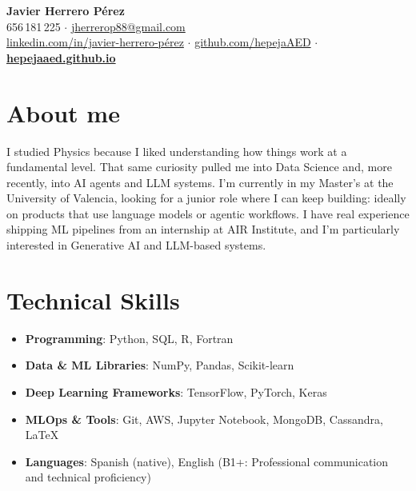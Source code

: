\documentclass[letterpaper,10pt]{article}
\newcommand{\resumeItem}[1]{\item\small{#1}}
\newcommand{\resumeSubHeadingList}{\begin{itemize}[leftmargin=0.1in, label={}, topsep=4pt, itemsep=6pt, parsep=0pt]}
\newcommand{\resumeSubHeadingListEnd}{\end{itemize}}
\begin{document}
\begin{center}
  {\color{accent}\textbf{\Huge Javier Herrero Pérez}} \\[5pt]
  \small
  656\,181\,225 \textcolor{accent}{$\cdot$}
  \href{mailto:jherrerop88@gmail.com}{jherrerop88@gmail.com} \\[3pt]
  \href{https://www.linkedin.com/in/javier-herrero-p\%C3\%A9rez-ba672b271/}{linkedin.com/in/javier-herrero-pérez}
  \textcolor{accent}{$\cdot$}
  \href{https://github.com/hepejaAED}{github.com/hepejaAED}
  \textcolor{accent}{$\cdot$}
  \textbf{\href{https://hepejaaed.github.io/}{hepejaaed.github.io}}
\end{center}

\section{About me}
I studied Physics because I liked understanding how things work at a fundamental level. That same curiosity pulled me into Data Science and, more recently, into AI agents and LLM systems. I'm currently in my Master's at the University of Valencia, looking for a junior role where I can keep building: ideally on products that use language models or agentic workflows. I have real experience shipping ML pipelines from an internship at AIR Institute, and I'm particularly interested in Generative AI and LLM-based systems.


\section{Technical Skills}
\resumeSubHeadingList
    \resumeItem{\textbf{Programming}: Python, SQL, R, Fortran}
  \resumeItem{\textbf{Data \& ML Libraries}: NumPy, Pandas, Scikit-learn}
  \resumeItem{\textbf{Deep Learning Frameworks}: TensorFlow, PyTorch, Keras}
  \resumeItem{\textbf{MLOps \& Tools}: Git, AWS, Jupyter Notebook, MongoDB, Cassandra, LaTeX}
    \resumeItem{\textbf{Languages}: Spanish (native), English (B1+: Professional communication and technical proficiency)}
\resumeSubHeadingListEnd
\end{document}
